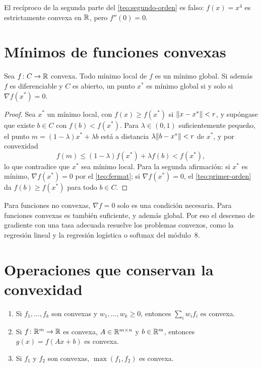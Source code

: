 \begin{observacion}
El recíproco de la segunda parte del \cref{teo:segundo-orden} es falso: $f(x)=x^{4}$ es estrictamente convexa en $\mathbb{R}$, pero $f''(0)=0$.
\end{observacion}

\section{Mínimos de funciones convexas}

\begin{teorema}\label{teo:local-global}
Sea $f\colon C\to\mathbb{R}$ convexa. Todo mínimo local de $f$ es un mínimo global. Si además $f$ es diferenciable y $C$ es abierto, un punto $x^{*}$ es mínimo global si y solo si $\nabla f(x^{*})=0$.
\end{teorema}

\begin{proof}
Sea $x^{*}$ un mínimo local, con $f(x)\ge f(x^{*})$ si $\lVert x-x^{*}\rVert<r$, y supóngase que existe $b\in C$ con $f(b)<f(x^{*})$. Para $\lambda\in(0,1)$ suficientemente pequeño, el punto $m=(1-\lambda)x^{*}+\lambda b$ está a distancia $\lambda\lVert b-x^{*}\rVert<r$ de $x^{*}$, y por convexidad
\[
f(m)\le(1-\lambda)f(x^{*})+\lambda f(b)<f(x^{*}),
\]
lo que contradice que $x^{*}$ sea mínimo local. Para la segunda afirmación: si $x^{*}$ es mínimo, $\nabla f(x^{*})=0$ por el \cref{teo:fermat}; si $\nabla f(x^{*})=0$, el \cref{teo:primer-orden} da $f(b)\ge f(x^{*})$ para todo $b\in C$.
\end{proof}

Para funciones no convexas, $\nabla f=0$ solo es una condición necesaria. Para funciones convexas es también suficiente, y además global. Por eso el descenso de gradiente con una tasa adecuada resuelve los problemas convexos, como la regresión lineal y la regresión logística o softmax del módulo~8.

\section{Operaciones que conservan la convexidad}

\begin{proposicion}\label{prop:operaciones}
\begin{enumerate}
  \item Si $f_1,\dots,f_k$ son convexas y $w_1,\dots,w_k\ge 0$, entonces $\sum_i w_if_i$ es convexa.
  \item Si $f\colon\mathbb{R}^{m}\to\mathbb{R}$ es convexa, $A\in\mathbb{R}^{m\times n}$ y $b\in\mathbb{R}^{m}$, entonces $g(x)=f(Ax+b)$ es convexa.
  \item Si $f_1$ y $f_2$ son convexas, $\max(f_1,f_2)$ es convexa.
\end{enumerate}
\end{proposicion}

